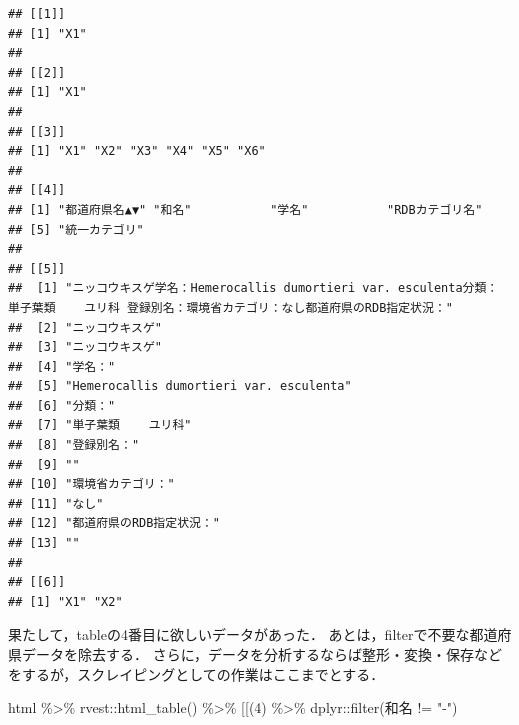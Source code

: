\documentclass[
]{article}
\newenvironment{Shaded}{\begin{snugshade}}{\end{snugshade}}
\newcommand{\AttributeTok}[1]{\textcolor[rgb]{0.77,0.63,0.00}{#1}}
\newcommand{\DecValTok}[1]{\textcolor[rgb]{0.00,0.00,0.81}{#1}}
\newcommand{\FunctionTok}[1]{\textcolor[rgb]{0.00,0.00,0.00}{#1}}
\newcommand{\NormalTok}[1]{#1}
\newcommand{\SpecialCharTok}[1]{\textcolor[rgb]{0.00,0.00,0.00}{#1}}
\newcommand{\StringTok}[1]{\textcolor[rgb]{0.31,0.60,0.02}{#1}}
\begin{document}
\begin{verbatim}
## [[1]]
## [1] "X1"
## 
## [[2]]
## [1] "X1"
## 
## [[3]]
## [1] "X1" "X2" "X3" "X4" "X5" "X6"
## 
## [[4]]
## [1] "都道府県名▲▼" "和名"           "学名"           "RDBカテゴリ名" 
## [5] "統一カテゴリ"  
## 
## [[5]]
##  [1] "ニッコウキスゲ学名：Hemerocallis dumortieri var. esculenta分類： 単子葉類    ユリ科 登録別名：環境省カテゴリ：なし都道府県のRDB指定状況："
##  [2] "ニッコウキスゲ"                                                                                                                           
##  [3] "ニッコウキスゲ"                                                                                                                           
##  [4] "学名："                                                                                                                                   
##  [5] "Hemerocallis dumortieri var. esculenta"                                                                                                   
##  [6] "分類："                                                                                                                                   
##  [7] "単子葉類    ユリ科"                                                                                                                       
##  [8] "登録別名："                                                                                                                               
##  [9] ""                                                                                                                                         
## [10] "環境省カテゴリ："                                                                                                                         
## [11] "なし"                                                                                                                                     
## [12] "都道府県のRDB指定状況："                                                                                                                  
## [13] ""                                                                                                                                         
## 
## [[6]]
## [1] "X1" "X2"
\end{verbatim}

果たして，tableの4番目に欲しいデータがあった．
あとは，filterで不要な都道府県データを除去する．
さらに，データを分析するならば整形・変換・保存などをするが，スクレイピングとしての作業はここまでとする．

\begin{Shaded}
\begin{Highlighting}[]
\NormalTok{html }\SpecialCharTok{\%\textgreater{}\%}
\NormalTok{  rvest}\SpecialCharTok{::}\FunctionTok{html\_table}\NormalTok{() }\SpecialCharTok{\%\textgreater{}\%}
  \StringTok{\textasciigrave{}}\AttributeTok{[[}\StringTok{\textasciigrave{}}\NormalTok{(}\DecValTok{4}\NormalTok{) }\SpecialCharTok{\%\textgreater{}\%}
\NormalTok{  dplyr}\SpecialCharTok{::}\FunctionTok{filter}\NormalTok{(和名 }\SpecialCharTok{!=} \StringTok{"{-}"}\NormalTok{)}
\end{Highlighting}
\end{Shaded}
\end{document}
